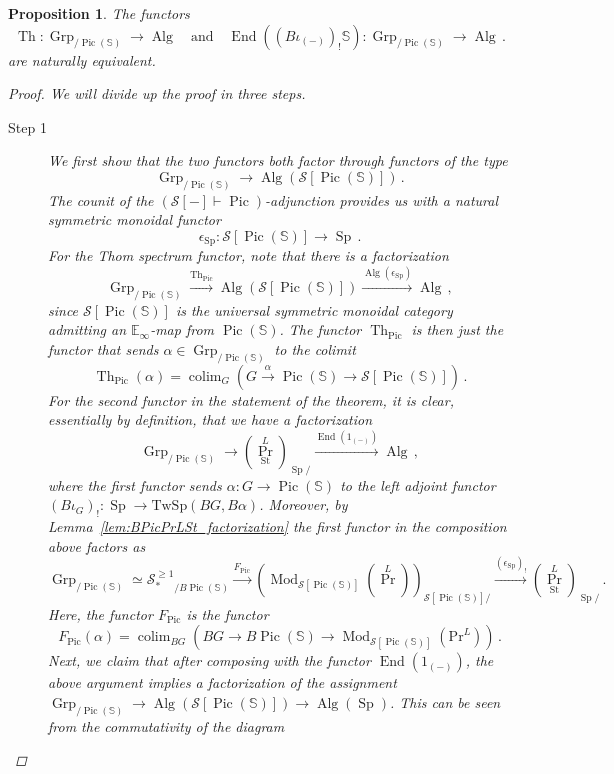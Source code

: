 \documentclass[10pt]{amsart}
\newcommand{\longto}{\longrightarrow}
\theoremstyle{plain}
\newtheorem{proposition}[theorem]{Proposition}
\theoremstyle{definition}
\DeclareMathOperator*{\colim}{colim}
\DeclareMathOperator{\Mod}{Mod}
\DeclareMathOperator{\End}{End}
\DeclareMathOperator{\Grp}{Grp}
\DeclareMathOperator{\Sp}{Sp}
\DeclareMathOperator{\Th}{Th}
\DeclareMathOperator{\Pic}{Pic}
\DeclareMathOperator{\Alg}{Alg}
\def\on{\operatorname}
\newcommand{\St}{\mathrm{St}}
\newcommand{\bE}{\mathbb{E}}
\newcommand{\bS}{\mathbb{S}}
\newcommand{\cC}{\mathcal{C}}
\newcommand{\calD}{\mathcal{D}}
\newcommand{\TwSp}{\mathrm{TwSp}}
\newcommand{\cS}{\mathcal{S}}
\newcommand{\och}{\quad \text{and} \quad}
\begin{document}
\begin{proposition} \label{prop naturality of shit}
  The functors
  \[
  \Th : \Grp_{/\Pic(\bS)} \longto \Alg \och \End((B\iota_{(-)})_! \bS) : \Grp_{/\Pic(\bS)} \longto \Alg \,.
  \]
  are naturally equivalent.
  \begin{proof}
    We will divide up the proof in three steps.
    \begin{description}
      \item[Step 1] We first show that the two functors both factor through functors of the type
      \[
      \on{Grp}_{/\Pic(\bS)} \to \Alg(\cS[\Pic(\bS)]) \,.
      \]
       The counit of the $(\cS[-] \vdash \Pic)$-adjunction provides us with a natural symmetric monoidal functor
       \[
       \epsilon_{\Sp} : \cS[\Pic(\bS)] \to \Sp \,.
       \]
      For the Thom spectrum functor, note that there is a factorization
      \[
      \Grp_{/ \Pic(\bS)} \xrightarrow {\Th_{\Pic}} \Alg(\cS[\Pic(\bS)]) \overset{\Alg(\epsilon_{\Sp})}\longto \Alg \,,
      \]
       since $\cS[\Pic(\bS)]$ is the universal symmetric monoidal category admitting an $\bE_{\infty}$-map from $\Pic(\bS)$.
       The functor $\Th_{\Pic}$ is then just the functor that sends $\alpha \in \Grp_{/\Pic(\bS)}$ to the colimit
       \[
       \Th_{\Pic}(\alpha) = \colim_G\left(G \overset{\alpha}\to \Pic(\bS) \to \cS[\Pic(\bS)] \right) \,.
       \]
       For the second functor in the statement of the theorem, it is clear, essentially by definition, that we have a factorization
       \[
       \Grp_{/\Pic(\bS)} \longto (\on{Pr}^{L}_{\St})_{\Sp / } \overset{\End(1_{(-)})}\longto \Alg \,,
       \]
       where the first functor sends $\alpha : G \to \Pic(\bS)$ to the left adjoint functor $(B\iota_G)_! : \Sp \to \TwSp(BG,B\alpha)$.
       Moreover, by Lemma~\ref{lem:BPicPrLSt_factorization} the first functor in the composition above factors as
      \[
      \Grp_{/ \Pic(\bS)} \simeq {\cS_*^{\geq 1}}_{/ B \Pic(\bS)} \overset{F_{\Pic}}\longto  (\Mod_{\cS[\Pic(\bS)]}(\on{Pr}^{L}))_{\cS[\Pic(\bS)]/} \overset{(\epsilon_{\Sp})_!}\longto  (\on{Pr}^{L}_{\St})_{\Sp / } \,.
      \]
      Here, the functor $F_{\Pic}$ is the functor
      \[
      F_{\Pic}(\alpha) = \colim_{BG} \left(BG \longto B\Pic(\bS) \longto \Mod_{\cS[\Pic(\bS)]}(\mathrm{Pr}^{L})\right) \,.
      \]
      Next, we claim that after composing with the functor $\End(1_{(-)})$, the above argument implies a factorization of the assignment  $\Grp_{/ \Pic(\bS)} \to \Alg(\cS[\Pic(\bS)]) \to \Alg(\Sp)$. This can be seen from the commutativity of the diagram

\end{description}
\end{proof}
\end{proposition}
\end{document}
